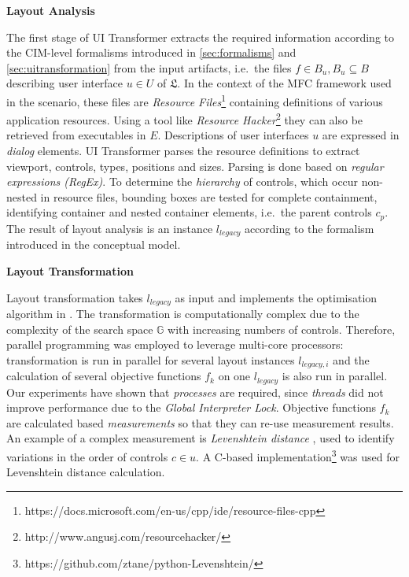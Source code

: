 \textbf{Layout Analysis}

The first stage of UI Transformer extracts the required information according to the CIM-level formalisms introduced in \cref{sec:formalisms} and \cref{sec:uitransformation} from the input artifacts, i.e.~the files \(f \in B_u, B_u \subseteq B\) describing user interface \(u \in U\) of \(\mathfrak{L}\).
In the context of the MFC framework used in the scenario, these files are \emph{Resource Files}\footnote{https://docs.microsoft.com/en-us/cpp/ide/resource-files-cpp} containing definitions of various application resources.
Using a tool like \emph{Resource Hacker}\footnote{http://www.angusj.com/resourcehacker/} they can also be retrieved from executables in \(E\).
Descriptions of user interfaces \(u\) are expressed in \emph{dialog} elements.
UI Transformer parses the resource definitions to extract viewport, controls, types, positions and sizes.
Parsing is done based on \emph{regular expressions (RegEx)}.
To determine the \emph{hierarchy} of controls, which occur non-nested in resource files, bounding boxes are tested for complete containment, identifying container and nested container elements, i.e.~the parent controls \(c_p\).
The result of layout analysis is an instance \(l_{legacy}\) according to the formalism introduced in the conceptual model.

\textbf{Layout Transformation}

Layout transformation takes \(l_{legacy}\) as input and implements the optimisation algorithm in .
The transformation is computationally complex due to the complexity of the search space \(\mathbb{G}\) with increasing numbers of controls.
Therefore, parallel programming was employed to leverage multi-core processors: transformation is run in parallel for several layout instances \(l_{legacy,i}\) and the calculation of several objective functions \(f_k\) on one \(l_{legacy}\) is also run in parallel.
Our experiments have shown that \emph{processes} are required, since \emph{threads} did not improve performance due to the \emph{Global Interpreter Lock}.
Objective functions \(f_k\) are calculated based \emph{measurements} so that they can re-use measurement results.
An example of a complex measurement is \emph{Levenshtein distance} , used to identify variations in the order of controls \(c \in u\).
A C-based implementation\footnote{https://github.com/ztane/python-Levenshtein/} was used for Levenshtein distance calculation.

